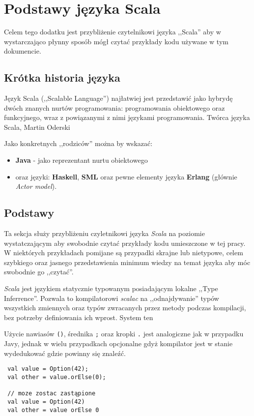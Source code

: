 \chapter{Podstawy języka Scala}
\label{cha:appendixA}
Celem tego dodatku jest przybliżenie czytelnikowi języka ,,Scala'' aby w wystarczająco płynny sposób mógł czytać przykłady kodu używane w tym dokumencie.

\section{Krótka historia języka}
\label{sec:scala_history}
Język Scala (,,Scalable Language'') najłatwiej jest przedstawić jako hybrydę dwóch znanych nurtów programowania: programowania obiektowego oraz funkcyjnego, wraz z 
powiązanymi z nimi językami programowania. Twórca języka Scala, Martin Oderski\cite{odersky_scala}

Jako konkretnych ,,rodziców'' można by wskazać: 
\begin{itemize}
 \item \textbf{Java} - jako reprezentant nurtu obiektowego 
 \item oraz języki: \textbf{Haskell}, \textbf{SML} oraz pewne elementy języka \textbf{Erlang} (głównie \textit{Actor model}).
\end{itemize}


\section{Podstawy}
\label{sec:scala_basics}
Ta sekcja służy przybliżeniu czyletnikowi języka \textit{Scala} na poziomie wystatczającym aby swobodnie czytać przykłady
kodu umieszczone w tej pracy. W niektórych przykładach pomijane są przypadki skrajne lub nietypowe, celem szybkiego oraz 
jasnego przedstawienia minimum wiedzy na temat języka aby móc swobodnie go ,,czytać''.

\textit{Scala} jest językiem statycznie typowanym posiadającym lokalne ,,Type Inferrence''. Pozwala to kompilatorowi 
\textit{scalac} na ,,odnajdywanie'' typów wszystkich zmiennych oraz typów zwracanych przez metody podczas kompilacji,
bez potrzeby definiowania ich wprost. System ten

Użycie nawiasów \verb|()|, średnika \verb|;| oraz kropki \verb|.| jest analogiczne jak w przypadku Javy, 
jednak w wielu przypadkach opcjonalne gdyż kompilator jest w stanie wydedukować gdzie powinny się znaleźć.
\begin{lstlisting}
 val value = Option(42);
 val other = value.orElse(0);

 // moze zostac zastąpione
 val value = Option(42)
 val other = value orElse 0
\end{lstlisting}

